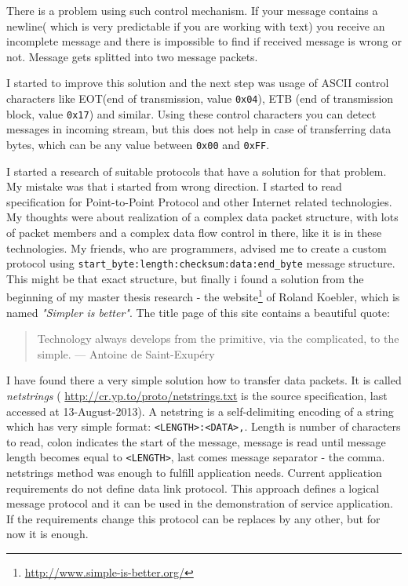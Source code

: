 There is a problem using such control mechanism. If your message contains a 
newline( which is very predictable if you are working with text) you receive an
incomplete message and there is impossible to find if received message is wrong
or not. Message gets splitted into two message packets.

I started to improve this solution and the next step was usage of ASCII control
characters like EOT(end of transmission, value \texttt{0x04}), ETB (end of
transmission block, value \texttt{0x17}) and similar. Using these  control
characters you can detect messages in incoming stream, but this does not help in case of transferring data
bytes, which can be any value between \texttt{0x00} and \texttt{0xFF}.


I started a research of suitable protocols that have a solution for that problem.
My mistake was that i started from wrong direction.
I started to read
specification for Point-to-Point Protocol and other Internet related
technologies.
My thoughts were about realization of a complex data packet structure, with lots
of packet members and a complex data flow control in there, like it is in these
technologies. My friends, who are programmers, advised me to create a custom
protocol using \texttt{\mbox{start\_byte:length:checksum:data:end\_byte}} message
structure. This might be that exact structure, but finally i found a solution
from the beginning of my master thesis research - the
website\footnote{\url{http://www.simple-is-better.org/}} of Roland Koebler, which is named \textit{"Simpler is better"}.
The title page of this site contains a beautiful quote:
\begin{quotation} 
Technology always develops from the primitive, via the complicated, to the
simple. \newline
— Antoine de Saint-Exupéry
\end{quotation}

I have found there a very simple solution how to transfer data packets. It is
called \textit{netstrings} ( \url{http://cr.yp.to/proto/netstrings.txt} is the
source specification, last accessed at 13-August-2013). 
A netstring is a self-delimiting encoding of a string
which has very simple format: \texttt{<LENGTH>:<DATA>,}. Length is number of
characters to read, colon indicates the start of the message, message is read
until message length becomes equal to \texttt{<LENGTH>}, last comes message
separator - the comma.
\label{sec:netstrings}
netstrings method was enough to fulfill application needs. 
Current application requirements do not define data link protocol.
This approach defines  a logical message protocol and it can be used in the
demonstration of service application. If the requirements change this protocol
can be replaces by any other, but for now it is enough.


